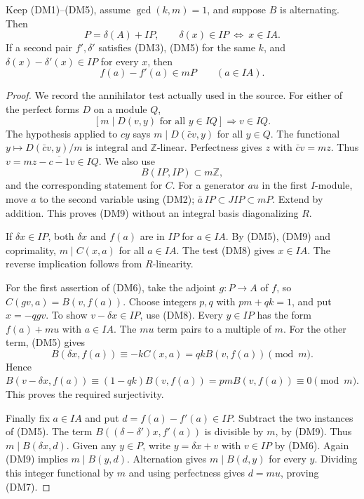 \begin{lemma}
\label{lem:ftb-dual-half-kernel-match}
Keep (DM1)--(DM5), assume \(\gcd(k,m)=1\), and suppose \(B\)
is alternating.
Then
\[
 P=\delta(A)+IP,\qquad
             \delta(x)\in IP\ \Longleftrightarrow\ x\in IA.       \tag{DM6}
\]
If a second pair \(f',\delta'\) satisfies (DM3), (DM5) for
the same \(k\), and
\(\delta(x)-\delta'(x)\in IP\) for every \(x\), then
\[
                   f(a)-f'(a)\in mP\qquad(a\in IA).        \tag{DM7}
\]
\end{lemma}
\begin{proof}
We record the annihilator test actually used in the source.
For either of the perfect forms \(D\) on a module \(Q\),
\[
 \left[m\mid D(v,y)\text{ for all }y\in IQ\right]
                                  \Longrightarrow v\in IQ.      \tag{DM8}
\]
The hypothesis applied to \(cy\) says
\(m\mid D(\bar c v,y)\) for all \(y\in Q\).
The functional \(y\mapsto D(\bar c v,y)/m\) is integral and
\(\mathbb Z\)-linear.  Perfectness gives \(z\) with
\(\bar c v=mz\).
Thus \(v=mz-\overline{c-1}v\in IQ\).
We also use
\[
                         B(IP,IP)\subset m\mathbb Z,      \tag{DM9}
\]
and the corresponding statement for \(C\).
For a generator \(a u\) in the first \(I\)-module, move
\(a\) to the second variable using (DM2);
\(\bar a\,IP\subset JIP\subset mP\).
Extend by addition.  This proves (DM9) without an
integral basis diagonalizing \(R\).

If \(\delta x\in IP\), both \(\delta x\) and \(f(a)\) are
in \(IP\) for \(a\in IA\).
By (DM5), (DM9) and coprimality,
\(m\mid C(x,a)\) for all \(a\in IA\).
The test (DM8) gives \(x\in IA\).
The reverse implication follows from \(R\)-linearity.

For the first assertion of (DM6), take the adjoint
\(g:P\to A\) of \(f\), so \(C(gv,a)=B(v,f(a))\).
Choose integers \(p,q\) with \(pm+qk=1\), and put
\(x=-qgv\).
To show \(v-\delta x\in IP\), use (DM8).
Every \(y\in IP\) has the form \(f(a)+mu\) with \(a\in IA\).
The \(mu\) term pairs to a multiple of \(m\).
For the other term, (DM5) gives
\[
 B(\delta x,f(a))\equiv-kC(x,a)
                   =qkB(v,f(a))\pmod m.
\]
Hence \(B(v-\delta x,f(a))\equiv
(1-qk)B(v,f(a))=pmB(v,f(a))\equiv0\pmod m\).
This proves the required surjectivity.

Finally fix \(a\in IA\) and put \(d=f(a)-f'(a)\in IP\).
Subtract the two instances of (DM5).
The term \(B((\delta-\delta')x,f'(a))\) is divisible by
\(m\), by (DM9).  Thus \(m\mid B(\delta x,d)\).
Given any \(y\in P\), write \(y=\delta x+v\) with \(v\in IP\)
by (DM6).  Again (DM9) implies \(m\mid B(y,d)\).
Alternation gives \(m\mid B(d,y)\) for every \(y\).
Dividing this integer functional by \(m\) and using
perfectness gives \(d=mu\), proving (DM7).
\end{proof}

